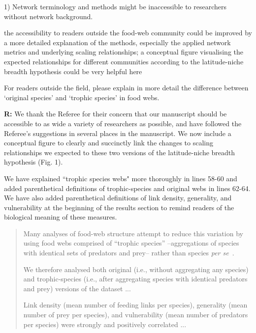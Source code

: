 \documentclass[12pt]{letter}
\newenvironment{refquote}{\bigskip \begin{it}}{\end{it}\smallskip}
\begin{document}
  1) Network terminology and methods might be inaccessible to researchers
  without network background.

  \begin{refquote}

    the accessibility to readers outside the food-web community could be
    improved by a more detailed explanation of the methods, especially the
    applied network metrics and underlying scaling relationships; a conceptual
    figure visualising the expected relationships for different communities
    according to the latitude-niche breadth hypothesis could be very helpful
    here

    \smallskip

     For readers outside the field, please explain in more detail the
     difference between `original species' and `trophic species' in food webs.

  \end{refquote}


  \textbf{R:} We thank the Referee for their concern that our manuscript
  should be accessible to as wide a variety of researchers as possible, and
  have followed the Referee's suggestions in several places in the manuscript.
  We now include a conceptual figure to clearly and succinctly link the changes
  to scaling relationships we expected to these two versions of the latitude-niche
  breadth hypothesis (Fig. 1).


  We have explained ``trophic species webs" more thoroughly
  in lines 58-60 and added parenthetical definitions of
  trophic-species and original webs in lines 62-64. We have also added parenthetical definitions
  of link density, generality, and vulnerability at the beginning of the results section
  to remind readers of the biological meaning of these measures.

  \begin{quotation}

    Many analyses of food-web structure attempt to reduce 
    this variation by using food webs comprised of ``trophic
    species'' --aggregations of species with identical sets 
    of predators and prey-- rather than species 
    \emph{per se}~\cite{Martinez1991,Dunne2004,Vermaat2009,Dunne2013}.

    \smallskip

    We therefore analysed both original (i.e., without 
    aggregating any species) and trophic-species (i.e., 
    after aggregating species with identical predators and 
    prey) versions of the dataset ...

    \smallskip

    Link density (mean number of feeding links per 
    species), generality (mean number of prey per species), 
    and vulnerability (mean number of predators per 
    species) were strongly and positively correlated ...

  \end{quotation}
\end{document}
